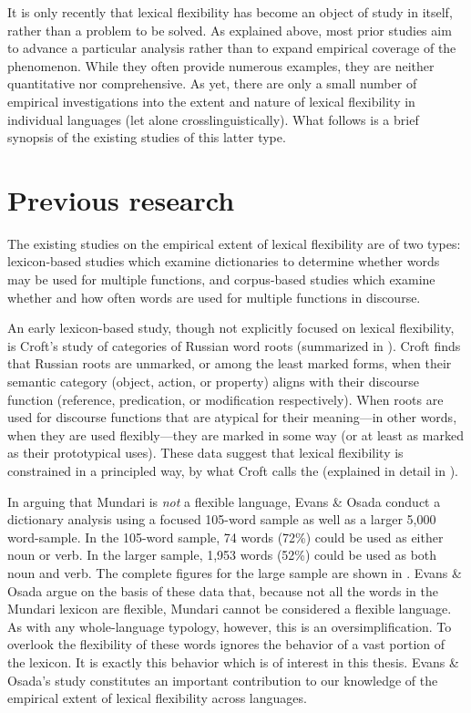 It is only recently that lexical flexibility has become an object of study in itself, rather than a problem to be solved. As explained above, most prior studies aim to advance a particular analysis rather than to expand empirical coverage of the phenomenon. While they often provide numerous examples, they are neither quantitative nor comprehensive. As yet, there are only a small number of empirical investigations into the extent and nature of lexical flexibility in individual languages (let alone crosslinguistically). What follows is a brief synopsis of the existing studies of this latter type.

\section{Previous research}
\label{sec:1.2}

The existing studies on the empirical extent of lexical flexibility are of two types: lexicon-based studies which examine dictionaries to determine whether words may be used for multiple functions, and corpus-based studies which examine whether and how often words are used for multiple functions in discourse.

An early lexicon-based study, though not explicitly focused on lexical flexibility, is Croft's  study of categories of Russian word roots (summarized in ). Croft finds that Russian roots are unmarked, or among the least marked forms, when their semantic category (object, action, or property) aligns with their discourse function (reference, predication, or modification respectively). When roots are used for discourse functions that are atypical for their meaning—in other words, when they are used flexibly—they are marked in some way (or at least as marked as their prototypical uses). These data suggest that lexical flexibility is constrained in a principled way, by what Croft calls the  (explained in detail in ).

In arguing that Mundari is \emph{not} a flexible language, Evans \& Osada  conduct a dictionary analysis using a focused 105-word sample as well as a larger 5,000 word-sample. In the 105-word sample, 74 words (72\%) could be used as either noun or verb. In the larger sample, 1,953 words (52\%) could be used as both noun and verb. The complete figures for the large sample are shown in . Evans \& Osada argue on the basis of these data that, because not all the words in the Mundari lexicon are flexible, Mundari cannot be considered a flexible language. As with any whole-language typology, however, this is an oversimplification. To overlook the flexibility of these words ignores the behavior of a vast portion of the lexicon. It is exactly this behavior which is of interest in this thesis. Evans \& Osada's study constitutes an important contribution to our knowledge of the empirical extent of lexical flexibility across languages.

